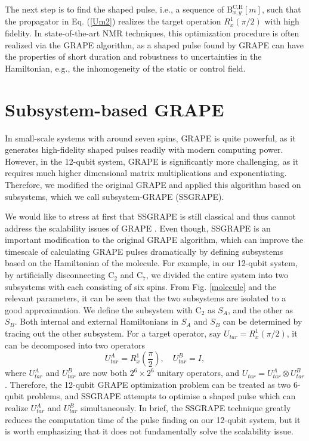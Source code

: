 \documentclass[twocolumn,reprint, amsmath,amssymb,showpacs,superscriptaddress]{revtex4-1}
\newcommand{\be}{\begin{equation}}
\newcommand{\ee}{\end{equation}}
\begin{document}
The next step is to find the shaped pulse, i.e., a sequence of $\text{B}_{x,y}^\text{C,H}[m]$, such that the propagator in Eq. (\ref{Um2}) realizes the target operation $R_x^1\left( \pi/2 \right)$ with high fidelity. In state-of-the-art NMR techniques, this optimization procedure is often realized via the GRAPE algorithm, as a shaped pulse found by GRAPE can have the properties of short duration and robustness to uncertainties in the Hamiltonian, e.g., the inhomogeneity of the static or control field.


\section{Subsystem-based GRAPE}


In small-scale systems with around seven spins, GRAPE is quite powerful, as it generates high-fidelity shaped pulses readily with modern computing power. However, in the 12-qubit system, GRAPE is significantly more challenging, as it requires much higher dimensional matrix multiplications and exponentiating. Therefore, we modified the original GRAPE and applied this algorithm based on subsystems, which we call subsystem-GRAPE (SSGRAPE).

We would like to stress at first that  SSGRAPE is still classical and thus cannot address the scalability issues of GRAPE \cite{ryan2008liquid}. Even though, SSGRAPE is an important modification to the original GRAPE algorithm, which can improve the timescale of calculating GRAPE pulses dramatically by defining subsystems based on the Hamiltonian of the molecule.
For example, in our 12-qubit system, by artificially disconnecting C$_2$ and   C$_7$, we divided the entire system into two subsystems with each consisting of six spins. From Fig. \ref{molecule} and the relevant parameters, it can be seen that the two subsystems are isolated to a good approximation. We define the subsystem with C$_2$ as $S_A$, and the other as $S_B$. Both internal and external Hamiltonians in $S_A$ and $S_B$ can be determined by tracing out the other subsystem. For a target operator, say $U_{tar} = R_x^1\left( \pi/2 \right)$, it can be decomposed into two operators
\be
U_{tar}^{A} = R_x^1\left( \frac{\pi}{2} \right), \quad  U_{tar}^{B} = I,
\ee
where $U_{tar}^{A}$ and $U_{tar}^{B}$ are now both $2^6 \times 2^6$ unitary operators, and $U_{tar} = U_{tar}^{A} \otimes U_{tar}^{B}$. Therefore, the 12-qubit GRAPE optimization problem can be treated as two 6-qubit problems, and SSGRAPE attempts to optimise a shaped pulse which can realize $U_{tar}^{A}$ and $U_{tar}^{B}$ simultaneously. In brief, the SSGRAPE technique greatly reduces the computation time of the pulse finding on our 12-qubit system, but it is worth emphasizing that it does not fundamentally solve the scalability issue.
\end{document}
